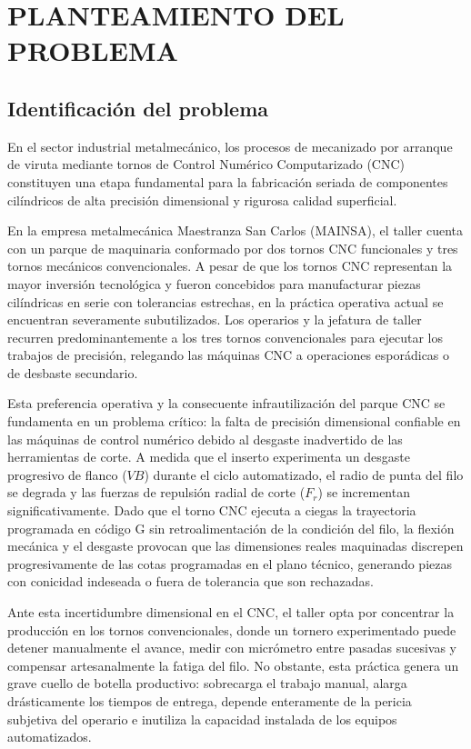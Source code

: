 \newpage
\section{PLANTEAMIENTO DEL PROBLEMA}

\subsection{Identificación del problema}
En el sector industrial metalmecánico, los procesos de mecanizado por arranque de viruta mediante tornos de Control Numérico Computarizado (CNC) constituyen una etapa fundamental para la fabricación seriada de componentes cilíndricos de alta precisión dimensional y rigurosa calidad superficial.

En la empresa metalmecánica Maestranza San Carlos (MAINSA), el taller cuenta con un parque de maquinaria conformado por dos tornos CNC funcionales y tres tornos mecánicos convencionales. A pesar de que los tornos CNC representan la mayor inversión tecnológica y fueron concebidos para manufacturar piezas cilíndricas en serie con tolerancias estrechas, en la práctica operativa actual se encuentran severamente subutilizados. Los operarios y la jefatura de taller recurren predominantemente a los tres tornos convencionales para ejecutar los trabajos de precisión, relegando las máquinas CNC a operaciones esporádicas o de desbaste secundario.

Esta preferencia operativa y la consecuente infrautilización del parque CNC se fundamenta en un problema crítico: la falta de precisión dimensional confiable en las máquinas de control numérico debido al desgaste inadvertido de las herramientas de corte. A medida que el inserto experimenta un desgaste progresivo de flanco ($VB$) durante el ciclo automatizado, el radio de punta del filo se degrada y las fuerzas de repulsión radial de corte ($F_r$) se incrementan significativamente. Dado que el torno CNC ejecuta a ciegas la trayectoria programada en código G sin retroalimentación de la condición del filo, la flexión mecánica y el desgaste provocan que las dimensiones reales maquinadas discrepen progresivamente de las cotas programadas en el plano técnico, generando piezas con conicidad indeseada o fuera de tolerancia que son rechazadas.

Ante esta incertidumbre dimensional en el CNC, el taller opta por concentrar la producción en los tornos convencionales, donde un tornero experimentado puede detener manualmente el avance, medir con micrómetro entre pasadas sucesivas y compensar artesanalmente la fatiga del filo. No obstante, esta práctica genera un grave cuello de botella productivo: sobrecarga el trabajo manual, alarga drásticamente los tiempos de entrega, depende enteramente de la pericia subjetiva del operario e inutiliza la capacidad instalada de los equipos automatizados. 

